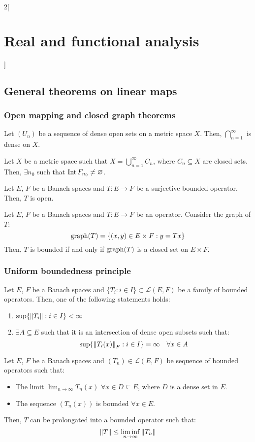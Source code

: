 \documentclass[../../../main_math.tex]{subfiles}
\begin{document}
\begin{multicols}{2}[\section{Real and functional analysis}]
  \subsection{General theorems on linear maps}
  \subsubsection{Open mapping and closed graph theorems}
  \begin{theorem}
    Let $(U_n)$ be a sequence of dense open sets on a metric space $X$. Then, $\bigcap_{n=1}^\infty$ is dense on $X$.
  \end{theorem}
  \begin{corollary}
    Let $X$ be a metric space such that $X=\bigcup_{n=1}^\infty C_n$, where $C_n\subseteq X$ are closed sets. Then, $\exists n_0$ such that $\operatorname{Int} F_{n_0}\ne \varnothing$.
  \end{corollary}
  \begin{theorem}
    Let $E$, $F$ be a Banach spaces and $T:E\rightarrow F$ be a surjective bounded operator. Then, $T$ is open.
  \end{theorem}
  \begin{theorem}
    Let $E$, $F$ be a Banach spaces and $T:E\rightarrow F$ be an operator. Consider the graph of $T$: $$\operatorname{graph}(T)=\{(x,y)\in E\times F:y=Tx\}$$
    Then, $T$ is bounded if and only if $\operatorname{graph}(T)$ is a closed set on $E\times F$.
  \end{theorem}
  \subsubsection{Uniform boundedness principle}
  \begin{theorem}
    Let $E$, $F$ be a Banach spaces and $\{T_i:i\in I\}\subset\mathcal{L}(E, F)$ be a family of bounded operators. Then, one of the following statements holds:
    \begin{enumerate}
      \item $\sup\{\left\|T_i\right\|:i\in I\}<\infty$
      \item $\exists A\subseteq E$ such that it is an intersection of dense open subsets such that: $$\sup\{\left\|T_i(x)\right\|_F:i\in I\}=\infty\quad\forall x\in A$$
    \end{enumerate}
  \end{theorem}
  \begin{corollary}
    Let $E$, $F$ be a Banach spaces and $(T_n)\in\mathcal{L}(E,F)$ be sequence of bounded operators such that:
    \begin{itemize}
      \item The limit $\lim_{n\to\infty}T_n(x)$ $\forall x\in D\subseteq E$, where $D$ is a dense set in $E$.
      \item The sequence $(T_n(x))$ is bounded $\forall x\in E$.
    \end{itemize}
    Then, $T$ can be prolongated into a bounded operator such that: $$\left\|T\right\|\leq \liminf_{n\to\infty}\left\|T_n\right\|$$
  \end{corollary}

\end{multicols}
\end{document}

